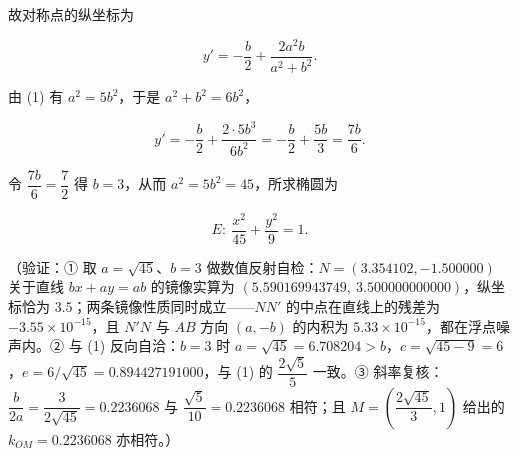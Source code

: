 \begin{answer}
故对称点的纵坐标为

\nopagebreak[4]
\[
y'=-\dfrac{b}{2}+\dfrac{2a^2b}{a^2+b^2}.
\]

由 (1) 有 \(a^2=5b^2\)，于是 \(a^2+b^2=6b^2\)，

\nopagebreak[4]
\[
y'=-\dfrac{b}{2}+\dfrac{2\cdot 5b^3}{6b^2}=-\dfrac{b}{2}+\dfrac{5b}{3}=\dfrac{7b}{6}.
\]

令 \(\dfrac{7b}{6}=\dfrac{7}{2}\) 得 \(b=3\)，从而 \(a^2=5b^2=45\)，所求椭圆为

\nopagebreak[4]
\[
E:\ \dfrac{x^2}{45}+\dfrac{y^2}{9}=1 .
\]

（验证：① 取 \(a=\sqrt{45}\)、\(b=3\) 做数值反射自检：\(N=(3.354102,-1.500000)\) 关于直线 \(bx+ay=ab\) 的镜像实算为 \((5.590169943749,\ 3.500000000000)\)，纵坐标恰为 \(3.5\)；两条镜像性质同时成立——\(NN'\) 的中点在直线上的残差为 \(-3.55\times 10^{-15}\)，且 \(N'N\) 与 \(AB\) 方向 \((a,-b)\) 的内积为 \(5.33\times 10^{-15}\)，都在浮点噪声内。② 与 (1) 反向自洽：\(b=3\) 时 \(a=\sqrt{45}=6.708204>b\)，\(c=\sqrt{45-9}=6\)，\(e=6/\sqrt{45}=0.894427191000\)，与 (1) 的 \(\dfrac{2\sqrt{5}}{5}\) 一致。③ 斜率复核：\(\dfrac{b}{2a}=\dfrac{3}{2\sqrt{45}}=0.2236068\) 与 \(\dfrac{\sqrt{5}}{10}=0.2236068\) 相符；且 \(M=\left(\dfrac{2\sqrt{45}}{3},1\right)\) 给出的 \(k_{OM}=0.2236068\) 亦相符。）



\end{answer}

